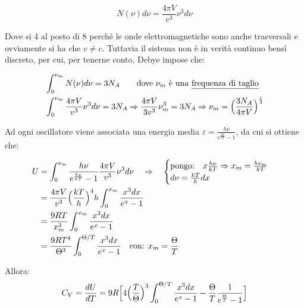 \begin{equation}
N(\nu)d\nu = \frac{ 4 \pi V}{v^3 } \nu^3 d\nu
\end{equation}

Dove si 4 al posto di 8 perché le onde elettromagnetiche sono anche trasversali e ovviamente si ha che $v \not = c$.
Tuttavia il sistema non è in verità continuo bensì discreto, per cui, per tenerne conto, Debye impose che:

\begin{equation}
\begin{split}
& \int_0^{\nu_m} N(\nu)d\nu = 3 N_A \quad \quad \mbox{dove $\nu_m$ è una \underline{frequenza di taglio}} \\
& \int_0^{\nu_m} \frac{ 4 \pi V}{v^3 } \nu^3 d\nu = 3 N_A \Rightarrow \frac{ 4 \pi V}{3 v^3 } \nu_m^3 = 3N_A \Rightarrow \nu_m = \Bigl(  \frac{ 3 N_A}{4 \pi V }  \Bigr)^{ \frac{ 1}{3 } }
\end{split}
\end{equation}

Ad ogni oscillatore viene associata una energia media $\varepsilon = \frac{ h \nu}{e^{ \frac{ h \nu}{k T } } - 1 }$, da cui si ottiene che:

\begin{equation}
\begin{split}
U & = \int_0^{\nu_m}  \frac{ h \nu}{e^{ \frac{ h \nu}{k T } } - 1 } \frac{ 4 \pi V}{v^3 } \nu^3  d\nu \quad \Rightarrow \quad
\begin{cases}
	\mbox{pongo:} \quad x \frac{ h \nu}{k T } \Rightarrow x_m = \frac{ h \nu_m}{k T } \\
	d\nu = \frac{ kT}{h } dx
\end{cases} \\
& = \frac{ 4 \pi V}{v^3 } \Bigl(  \frac{ kT}{h }  \Bigr)^4 h \int_0^{x_m} \frac{ x^3 dx}{e^x -1 } \\
& = \frac{ 9 R T}{x_m^3 } \int_0^{x_m} \frac{ x^3 dx}{e^x - 1 } \\
& = \frac{ 9 R T^4}{\Theta^3 } \int_0^{\Theta / T} \frac{ x^3 dx}{e^x -1 } \quad \mbox{con: } x_m = \frac{ \Theta}{T }
\end{split}
\end{equation}

Allora:
\begin{equation}
C_V = \frac{ dU}{dT } = 9R \Bigl[ 4 \Bigl(  \frac{ T}{\Theta }  \Bigr)^3 \int_0^{\Theta / T} \frac{ x^3 dx}{e^x -1 } - \frac{ \Theta}{T }\frac{ 1}{e^{ \frac{ \Theta}{T } } - 1 } \Bigr]
\end{equation}

